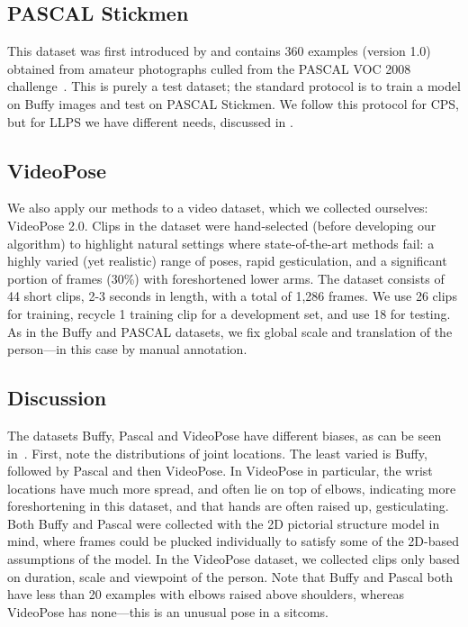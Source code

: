 \subsection{PASCAL Stickmen}  This dataset was first introduced by 
\citet{eichner09} and contains 360 examples (version 1.0) obtained from amateur 
photographs culled from the PASCAL VOC 2008 challenge~\citep{voc09}.  This is 
purely a test dataset; the standard protocol is to train a model on Buffy 
images and test on PASCAL Stickmen. We follow this protocol for CPS, but for 
LLPS we have different needs, discussed in .

\subsection{VideoPose}

We also apply our methods to a video dataset, which we collected ourselves: 
VideoPose 2.0.  Clips in the dataset were hand-selected (before developing our 
algorithm) to highlight natural settings where state-of-the-art methods fail: a 
highly varied (yet realistic) range of poses, rapid gesticulation, and a 
significant portion of frames (30\%) with foreshortened lower arms.  The 
dataset consists of 44 short clips, 2-3 seconds in length, with a total of 
1,286 frames.  We use 26 clips for training, recycle 1 training clip for a 
development set, and use 18 for testing.  As in the Buffy and PASCAL datasets, 
we fix global scale and translation of the person---in this case by manual 
annotation.


\subsection{Discussion}  The datasets Buffy, Pascal and VideoPose have 
different biases, as can be seen in~.  First, note 
the distributions of joint locations.  The least varied is Buffy, followed by 
Pascal and then VideoPose.  In VideoPose in particular, the wrist locations 
have much more spread, and often lie on top of elbows, indicating more 
foreshortening in this dataset, and that hands are often raised up, 
gesticulating.  Both Buffy and Pascal were collected with the 2D pictorial 
structure model in mind, where frames could be plucked individually to satisfy 
some of the 2D-based assumptions of the model.  In the VideoPose dataset, we 
collected clips only based on duration, scale and viewpoint of the person.  
Note that Buffy and Pascal both have less than 20 examples with elbows raised 
above shoulders, whereas VideoPose has none---this is an unusual pose in a 
sitcoms.

